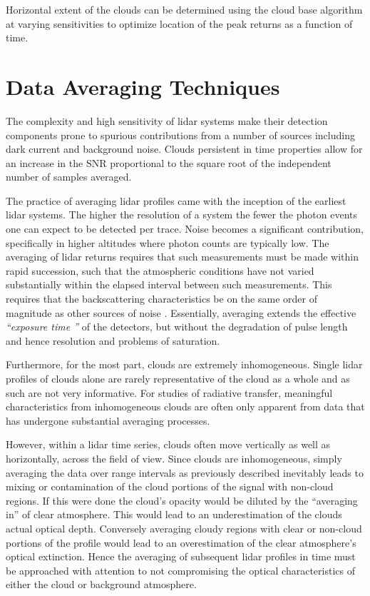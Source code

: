 Horizontal extent of the clouds can be determined using the cloud base algorithm
at varying sensitivities to optimize 
location of the peak returns as a function of time.

\section{Data Averaging Techniques}


The complexity and high sensitivity of lidar systems 
make their detection components prone to spurious contributions
from a number of sources including 
dark current and background noise.
Clouds persistent in time properties allow for
an increase in the SNR proportional
to the square root of the independent number of samples averaged.

The practice of averaging lidar profiles
came with the inception of the earliest lidar systems.
The higher the resolution of a system the fewer the photon events
one can expect to be detected per trace. 
Noise becomes a significant contribution, 
specifically in higher altitudes 
where photon counts are typically low. 
The averaging of lidar returns requires that 
such measurements must be made within rapid succession,
such that the atmospheric conditions have not varied
substantially within the elapsed interval between such measurements.
This requires that the backscattering characteristics be on
the same order of magnitude as other sources of noise
\cite{mjtmptw}\cite{nmdkkcrm}. Essentially, averaging
extends the effective {\em ``exposure time ''} of the detectors,
but without the degradation of pulse length and hence resolution 
and problems of saturation.

Furthermore, for the most part, clouds are
extremely inhomogeneous. Single lidar profiles of clouds alone
are rarely representative of the cloud as a whole
and as such are not very informative. 
For studies of radiative transfer, meaningful characteristics
from inhomogeneous clouds are often only apparent from data
that has undergone substantial averaging processes. 

However, within a lidar 
time series, clouds often move vertically
as well as horizontally, across the field of view. 
Since clouds are inhomogeneous, 
simply averaging the data over range intervals
as previously described inevitably leads to mixing or
contamination of the cloud portions of the signal with
non-cloud regions. If this were done the cloud's 
opacity would be diluted by the ``averaging in'' 
of clear atmosphere. This would lead to an underestimation
of the clouds actual optical depth. Conversely averaging cloudy regions with
clear or non-cloud portions of the profile would lead to 
an overestimation of the clear atmosphere's optical extinction.
Hence the averaging of subsequent lidar profiles in time
must be approached with attention to not compromising the optical
characteristics of either the cloud or background atmosphere.

